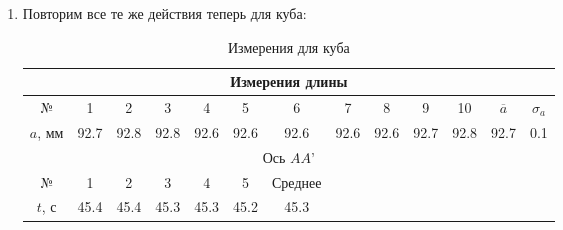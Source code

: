 \documentclass[a4paper, 12pt]{article}
\begin{document}
\begin{enumerate}
		\item Повторим все те же действия теперь для куба:
		\begin{table}[H]
			\centering
			\caption{Измерения для куба}
			\begin{tabular}{|ccccccccccccc|}
			\hline
			\multicolumn{13}{|c|}{Измерения длины}                                                                                                                                                                                                                                                                                                                                        \\ \hline
			\multicolumn{1}{|c|}{№}       & \multicolumn{1}{c|}{1}    & \multicolumn{1}{c|}{2}    & \multicolumn{1}{c|}{3}    & \multicolumn{1}{c|}{4}    & \multicolumn{1}{c|}{5}    & \multicolumn{1}{c|}{6}       & \multicolumn{1}{c|}{7}    & \multicolumn{1}{c|}{8}    & \multicolumn{1}{c|}{9}    & \multicolumn{1}{c|}{10}   & \multicolumn{1}{c|}{$\overline{a}$} & $\sigma_{a}$ \\ \hline
			\multicolumn{1}{|c|}{$a$, мм} & \multicolumn{1}{c|}{92.7} & \multicolumn{1}{c|}{92.8} & \multicolumn{1}{c|}{92.8} & \multicolumn{1}{c|}{92.6} & \multicolumn{1}{c|}{92.6} & \multicolumn{1}{c|}{92.6}    & \multicolumn{1}{c|}{92.6} & \multicolumn{1}{c|}{92.6} & \multicolumn{1}{c|}{92.7} & \multicolumn{1}{c|}{92.8} & \multicolumn{1}{c|}{92.7}           & 0.1          \\ \hline
			\multicolumn{13}{|c|}{Ось $AA’$}                                                                                                                                                                                                                                                                                                                                              \\ \hline
			\multicolumn{1}{|c|}{№}       & \multicolumn{1}{c|}{1}    & \multicolumn{1}{c|}{2}    & \multicolumn{1}{c|}{3}    & \multicolumn{1}{c|}{4}    & \multicolumn{1}{c|}{5}    & \multicolumn{1}{c|}{Среднее} & \multicolumn{1}{c|}{}     & \multicolumn{1}{c|}{}     & \multicolumn{1}{c|}{}     & \multicolumn{1}{c|}{}     & \multicolumn{1}{c|}{}               &              \\ \hline
			\multicolumn{1}{|c|}{$t$, с}  & \multicolumn{1}{c|}{45.4} & \multicolumn{1}{c|}{45.4} & \multicolumn{1}{c|}{45.3} & \multicolumn{1}{c|}{45.3} & \multicolumn{1}{c|}{45.2} & \multicolumn{1}{c|}{45.3}    & \multicolumn{1}{c|}{}     & \multicolumn{1}{c|}{}     & \multicolumn{1}{c|}{}     & \multicolumn{1}{c|}{}     & \multicolumn{1}{c|}{}               &              \\ \hline

\end{tabular}
\end{table}
\end{enumerate}
\end{document}
